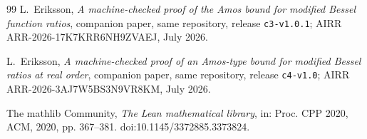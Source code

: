 \documentclass[11pt]{article}
\newcommand{\lean}[1]{\texttt{#1}}
\begin{document}
\begin{thebibliography}{99}
 L.~Eriksson,
\emph{A machine-checked proof of the Amos bound for modified Bessel
function ratios}, companion paper, same repository, release
\lean{c3-v1.0.1}; AIRR ARR-2026-17K7KRR6NH9ZVAEJ, July 2026.

 L.~Eriksson,
\emph{A machine-checked proof of an Amos-type bound for modified
Bessel ratios at real order}, companion paper, same repository,
release \lean{c4-v1.0}; AIRR ARR-2026-3AJ7W5BS3N9VR8KM, July 2026.

 The mathlib Community,
\emph{The Lean mathematical library}, in: Proc. CPP 2020, ACM, 2020,
pp. 367--381. doi:10.1145/3372885.3373824.

\end{thebibliography}
\end{document}
